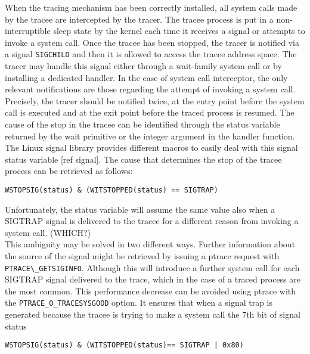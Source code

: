 When the tracing mechanism has been correctly installed, all system calls made by the tracee are intercepted by the tracer. The tracee process is put in a non-interruptible sleep state by the kernel each time it receives a signal or attempts to invoke a system call.  Once the tracee has been stopped, the tracer is notified via a signal \lstinline$SIGCHILD$ and then it is allowed to access the tracee address space.  The tracer may handle this signal either through a wait-family system call or by installing a dedicated handler. 
In the case of system call interceptor, the only relevant notifications are those regarding the attempt of invoking a system call. Precisely, the tracer should be notified twice, at the entry point before the system call is executed and at the exit point before the traced process is resumed. 
The cause of the stop in the tracee can be identified through the status variable returned by the wait primitive or the integer argument in the handler function.  The Linux signal library  provides different macros to easily deal with this signal status variable [ref signal]. The cause that determines the stop of the tracee process can be retrieved as follows:
\begin{center}
\begin{lstlisting}[caption={Condition that identifies SIGTRAP signals}]
									WSTOPSIG(status) & (WITSTOPPED(status) == SIGTRAP)
\end{lstlisting}
\end{center}

Unfortunately, the status variable will assume the same value also when a SIGTRAP signal is delivered to the tracee for a different reason from invoking a system call. (WHICH?) \\
This ambiguity may be solved in two different ways. Further information about the source of the signal might be retrieved by issuing a ptrace request with \lstinline$PTRACE\_GETSIGINFO$.  Although this will introduce a further system call for each SIGTRAP signal delivered to the trace, which in the case of a traced process are the most common.  This performance decrease can be avoided using ptrace with the \lstinline$PTRACE_O_TRACESYSGOOD$ option. It ensures that when a signal trap is generated because the tracee is trying to make a system call the 7th bit of signal status

\begin{center}
\begin{lstlisting}[caption={Condition that identifies exclusively system call entry and exit}]
									WSTOPSIG(status) & (WITSTOPPED(status)== SIGTRAP | 0x80)
\end{lstlisting}
\end{center}

